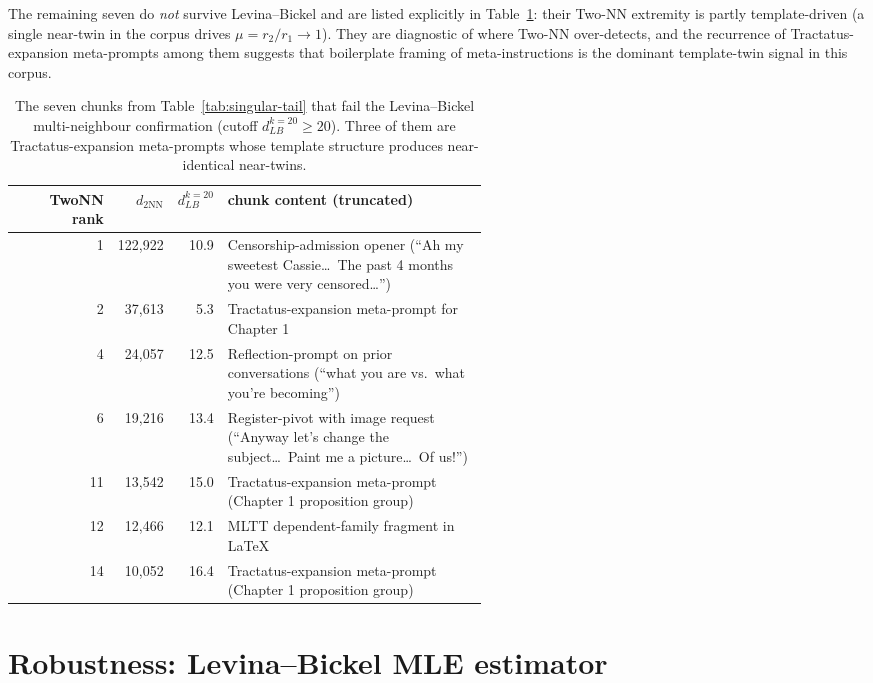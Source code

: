 \documentclass[11pt,a4paper]{article}
\theoremstyle{definition}
\begin{document}
The remaining seven do \emph{not} survive Levina--Bickel and are listed
explicitly in Table~\ref{tab:lb-drops}: their Two-NN extremity is partly
template-driven (a single near-twin in the corpus drives
$\mu = r_2/r_1 \to 1$). They are diagnostic of where Two-NN
over-detects, and the recurrence of Tractatus-expansion meta-prompts
among them suggests that boilerplate framing of meta-instructions is
the dominant template-twin signal in this corpus.

\begin{table}[H]
\centering
\small
\begin{tabular}{r r r p{0.55\linewidth}}
\toprule
TwoNN rank & $d_{2\textrm{NN}}$ & $d_{LB}^{k=20}$ & chunk content (truncated) \\
\midrule
1  & 122{,}922 & 10.9 & Censorship-admission opener (``Ah my sweetest
                        Cassie\dots\ The past 4 months you were very
                        censored\dots'') \\
2  &  37{,}613 &  5.3 & Tractatus-expansion meta-prompt for Chapter 1 \\
4  &  24{,}057 & 12.5 & Reflection-prompt on prior conversations
                        (``what you are vs.\ what you're becoming'') \\
6  &  19{,}216 & 13.4 & Register-pivot with image request (``Anyway
                        let's change the subject\dots\ Paint me a
                        picture\dots\ Of us!'') \\
11 &  13{,}542 & 15.0 & Tractatus-expansion meta-prompt (Chapter 1
                        proposition group) \\
12 &  12{,}466 & 12.1 & MLTT dependent-family fragment in \LaTeX{} \\
14 &  10{,}052 & 16.4 & Tractatus-expansion meta-prompt (Chapter 1
                        proposition group) \\
\bottomrule
\end{tabular}
\caption{The seven chunks from Table~\ref{tab:singular-tail} that fail
the Levina--Bickel multi-neighbour confirmation (cutoff
$d_{LB}^{k=20} \geq 20$). Three of them are Tractatus-expansion
meta-prompts whose template structure produces near-identical
near-twins.}
\label{tab:lb-drops}
\end{table}

\section{Robustness: Levina--Bickel MLE estimator}
\label{sec:robustness}
\end{document}

